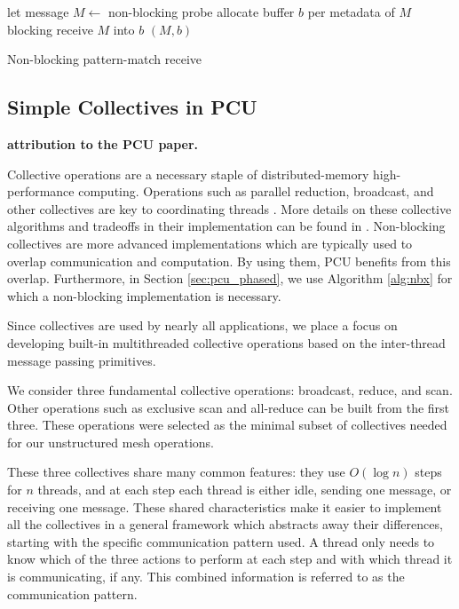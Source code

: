 \begin{algorithm}
\LinesNumbered
{}
let message $M \gets$ non-blocking probe\;
allocate buffer $b$ per metadata of $M$\;
blocking receive $M$ into $b$\;
\Return $(M,b)$\;
\caption{Non-blocking pattern-match receive}
\label{alg:receive}
\end{algorithm}

\subsection{Simple Collectives in PCU}
\label{sec:pcu_coll}

{\bf attribution to the PCU paper.}

Collective operations are a necessary staple of
distributed-memory high-performance computing.
Operations such as parallel reduction, broadcast, and other collectives
are key to coordinating threads \cite{pjevsivac2007performance}.
More details on these collective algorithms and tradeoffs in their
implementation can be found in \cite{thakur2003improving}.
Non-blocking collectives are more advanced implementations which
are typically used to overlap communication and computation.
By using them, PCU benefits from this overlap.
Furthermore, in Section \ref{sec:pcu_phased}, we use Algorithm \ref{alg:nbx}
for which a non-blocking implementation is necessary.

Since collectives are used by nearly all applications,
we place a focus on developing built-in
multithreaded collective operations based on the
inter-thread message passing primitives.

We consider three fundamental collective operations:
broadcast, reduce, and scan.
Other operations such as exclusive scan and all-reduce
can be built from the first three.
These operations were selected as the minimal subset
of collectives needed for our unstructured mesh operations.

These three collectives share many common features:
they use $O(\log n)$ steps for $n$ threads,
and at each step each thread is either idle, sending one
message, or receiving one message.
These shared characteristics make it easier to implement
all the collectives in a general framework which abstracts
away their differences, starting with the specific communication
pattern used.
A thread only needs to know which of the three actions to perform at each
step and with which thread it is communicating, if any.
This combined information is referred to as the communication pattern.

